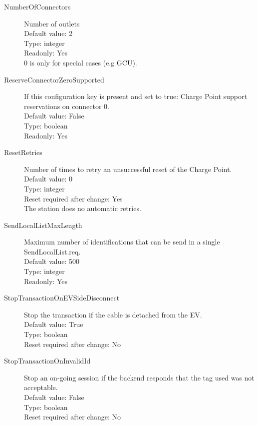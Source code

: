 \begin{description}
\item[NumberOfConnectors] Number of outlets\\
  Default value: 2\\
  Type: integer\\
  Readonly: Yes\\
  0 is only for special cases (e.g GCU).\\

\item[ReserveConnectorZeroSupported] If this configuration key is present and set to true: Charge Point support reservations on connector 0.\\
  Default value: False\\
  Type: boolean\\
  Readonly: Yes\\

\item[ResetRetries]  Number of times to retry an unsuccessful reset of the Charge Point.\\
  Default value: 0\\
  Type: integer\\
  Reset required after change: Yes\\
  The station does no automatic retries.\\

\item[SendLocalListMaxLength] Maximum number of identifications that can be send in a single SendLocalList.req.\\
  Default value: 500\\
  Type: integer\\
  Readonly: Yes\\

\item[StopTransactionOnEVSideDisconnect] Stop the transaction if the cable is detached from the EV.\\
  Default value: True\\
  Type: boolean\\
  Reset required after change: No\\

\item[StopTransactionOnInvalidId] Stop an on-going session if the backend responds that the tag used was not acceptable.\\
  Default value: False\\
  Type: boolean\\
  Reset required after change: No\\


\end{description}

